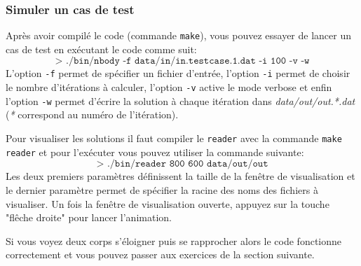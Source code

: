 \subsubsection{Simuler un cas de test}
Après avoir compilé le code (commande \texttt{make}), vous pouvez essayer de lancer un cas de test en exécutant le code comme suit:
\begin{equation*}
\texttt{> ./bin/nbody -f data/in/in.testcase.1.dat -i 100 -v -w}
\end{equation*}
L'option \texttt{-f} permet de spécifier un fichier d'entrée, l'option \texttt{-i} permet de choisir le nombre d'itérations à calculer, l'option \texttt{-v} active le mode verbose et enfin l'option \texttt{-w} permet d'écrire la solution à chaque itération dans \textit{data/out/out.*.dat} (\textit{*} correspond au numéro de l'itération).

Pour visualiser les solutions il faut compiler le \texttt{reader} avec la commande \texttt{make reader} et pour l'exécuter vous pouvez utiliser la commande suivante:
\begin{equation*}
\texttt{> ./bin/reader 800 600 data/out/out}
\end{equation*}
Les deux premiers paramètres définissent la taille de la fenêtre de visualisation et le dernier paramètre permet de spécifier la racine des noms des fichiers à visualiser.
Un fois la fenêtre de visualisation ouverte, appuyez sur la touche "flêche droite" pour lancer l'animation.

Si vous voyez deux corps s'éloigner puis se rapprocher alors le code fonctionne correctement et vous pouvez passer aux exercices de la section suivante.
